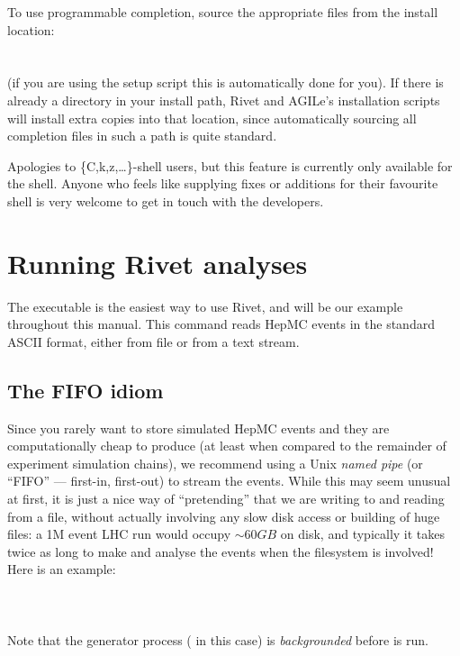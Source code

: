 \documentclass{JHEP3}
\begin{document}
To use programmable completion, source the appropriate files from the install
location:\\
\\
\\
(if you are using the setup script  this is automatically
done for you).
If there is already a  directory in
your install path, Rivet and AGILe's installation scripts will install extra
copies into that location, since automatically sourcing all completion files in
such a path is quite standard.

Apologies to \{C,k,z,\dots\}-shell users, but this feature is currently only
available for the  shell. Anyone who feels like supplying fixes or
additions for their favourite shell is very welcome to get in touch with the
developers.



\section{Running Rivet analyses}
\label{sec:agile-runmc}

The  executable is the easiest way to use Rivet, and will be our
example throughout this manual. This command reads HepMC events in the standard
ASCII format, either from file or from a text stream.

\subsection{The FIFO idiom}
\label{sec:fifo-idiom}

Since you rarely want to store simulated HepMC events and they are
computationally cheap to produce (at least when compared to the remainder of
experiment simulation chains), we recommend using a Unix \emph{named pipe} (or
``FIFO'' --- first-in, first-out) to stream the events. While this may seem
unusual at first, it is just a nice way of ``pretending'' that we are writing to
and reading from a file, without actually involving any slow disk access or
building of huge files: a 1M event LHC run would occupy $\sim 60 GB$ on disk,
and typically it takes twice as long to make and analyse the events when the
filesystem is involved! Here is an example:\\
\\
\\
\\
%
Note that the generator process ( in this case) is
\emph{backgrounded} before  is run.
\end{document}
